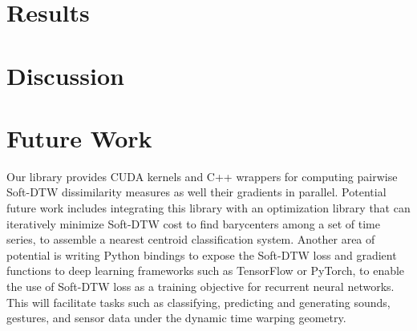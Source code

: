 \documentclass[12pt, letterpaper]{article}
\begin{document}
\section{Results}

\section{Discussion}

\section{Future Work}

Our library provides CUDA kernels and C++ wrappers for computing pairwise
Soft-DTW dissimilarity measures as well their gradients in parallel. Potential
future work includes integrating this library with an optimization library that
can iteratively minimize Soft-DTW cost to find barycenters among a set of time
series, to assemble a nearest centroid classification system. Another area of
potential is writing Python bindings to expose the Soft-DTW loss and gradient
functions to deep learning frameworks such as TensorFlow or PyTorch, to enable
the use of Soft-DTW loss as a training objective for recurrent neural networks.
This will facilitate tasks such as classifying, predicting and generating sounds,
gestures, and sensor data under the dynamic time warping geometry.

\printbibliography[]
\end{document}
